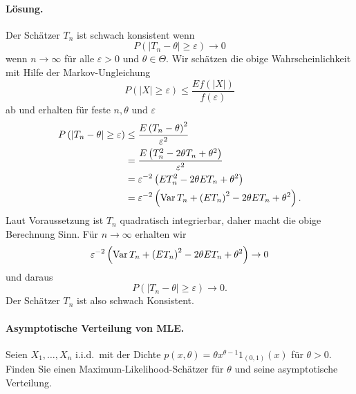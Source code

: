 \paragraph*{Lösung.} Der Schätzer $T_n$ ist schwach konsistent wenn
\begin{equation*}
    P\left( |T_n -\theta|\geq \varepsilon \right) \to 0
\end{equation*}
wenn $n\to\infty$ für alle $\varepsilon>0$ und $\theta\in\Theta$. Wir schätzen die obige
Wahrscheinlichkeit mit Hilfe der Markov-Ungleichung
\begin{equation*}
    P\left( |X|\geq \varepsilon \right) \leq \frac{E f(|X|)}{f(\varepsilon)}
\end{equation*}
ab und erhalten für feste $n,\theta$ und $\varepsilon$
\begin{align*}
    P\left( |T_n -\theta|\geq \varepsilon \right) &\leq \frac{E \left( T_n -\theta \right)^2}{\varepsilon^2} \\
    &= \frac{E \left( T_n^2 -2\theta T_n + \theta^2 \right) }{\varepsilon^2} \\
    &= \varepsilon^{-2}\left( E T_n^2 - 2\theta E T_n + \theta^2 \right) \\
    &= \varepsilon^{-2}\left( \operatorname{Var} T_n + \left( E T_n \right)^2 - 2\theta E T_n + \theta^2 \right).
\end{align*}
Laut Voraussetzung ist $T_n$ quadratisch integrierbar, daher macht die obige Berechnung Sinn.
Für $n\to\infty$ erhalten wir
\begin{equation*}
    \varepsilon^{-2}\left( \operatorname{Var} T_n + \left( E T_n \right)^2 - 2\theta E T_n + \theta^2 \right) \to 0
\end{equation*}
und daraus
\begin{equation*}
    P\left( |T_n -\theta|\geq \varepsilon \right) \to 0.
\end{equation*}
Der Schätzer $T_n$ ist also schwach Konsistent.







\paragraph{Asymptotische Verteilung von MLE.}   Seien $X_1,\ldots,X_n$ i.i.d.\ mit 
der Dichte $p(x,\theta)= \theta x^{\theta-1}1_{(0,1)}(x)$ für $\theta>0$. Finden Sie 
einen Maximum-Likelihood-Schätzer für $\theta$ und seine asymptotische Verteilung.

